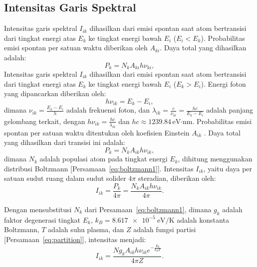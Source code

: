 \subsection{Intensitas Garis Spektral}
Intensitas garis spektral \( I_{ik} \) dihasilkan dari emisi spontan saat atom bertransisi dari tingkat energi atas \( E_k \) ke tingkat energi bawah \( E_i \) (\( E_i < E_k \)). Probabilitas emisi spontan per satuan waktu diberikan oleh \( A_{ki} \). Daya total yang dihasilkan adalah:
\begin{equation}
P_{k} = N_k A_{ki} h \nu_{ki}, \label{eq:power}
\end{equation}
Intensitas garis spektral \( I_{ik} \) dihasilkan dari emisi spontan saat atom bertransisi dari tingkat energi atas \( E_k \) ke tingkat energi bawah \( E_i \) (\( E_k > E_i \)). Energi foton yang dipancarkan diberikan oleh:
\begin{equation}
h \nu_{ik} = E_k - E_i,
\end{equation}
dimana \( \nu_{ik} = \frac{E_k - E_i}{h} \) adalah frekuensi foton, dan \( \lambda_{ik} = \frac{c}{\nu_{ik}} = \frac{h c}{E_k - E_i} \) adalah panjang gelombang terkait, dengan \( h \nu_{ik} = \frac{h c}{\lambda_{ik}} \) dan \( h c \approx 1239.84 \, \text{eV·nm} \). Probabilitas emisi spontan per satuan waktu ditentukan oleh koefisien Einstein \( A_{ik} \) \citep{Rybicki1985}. Daya total yang dihasilkan dari transisi ini adalah:
\begin{equation}
P_k = N_k A_{ik} h \nu_{ik}, \label{eq:power}
\end{equation}
dimana \( N_k \) adalah populasi atom pada tingkat energi \( E_k \), dihitung menggunakan distribusi Boltzmann [Persamaan~\eqref{eq:boltzmann1}]. Intensitas \( I_{ik} \), yaitu daya per satuan sudut ruang dalam sudut solider \( 4\pi \) steradian, diberikan oleh:
\begin{equation}
I_{ik} = \frac{P_k}{4\pi} = \frac{N_k A_{ik} h \nu_{ik}}{4\pi}. \label{eq:intensity}
\end{equation}

Dengan mensubstitusi \( N_k \) dari Persamaan~\eqref{eq:boltzmann1}, dimana \( g_k \) adalah faktor degenerasi tingkat \( E_k \), \( k_B = \SI{8.617e-5}{\electronvolt\per\kelvin} \) adalah konstanta Boltzmann, \( T \) adalah suhu plasma, dan \( Z \) adalah fungsi partisi [Persamaan~\eqref{eq:partition}], intensitas menjadi:
\begin{equation}
I_{ik} = \frac{N g_k A_{ik} h \nu_{ik} e^{-\frac{E_k}{k_B T}}}{4\pi Z}. \label{eq:intensity_full}
\end{equation}

